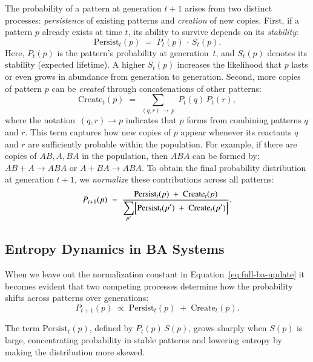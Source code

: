 \documentclass[preprint,12pt]{elsarticle}
\begin{document}
The probability of a pattern at generation \(t+1\) arises from two distinct processes:
\emph{persistence} of existing patterns and \emph{creation} of new copies. First, if a pattern \(p\) already exists at time \(t\), its ability to survive depends on its \emph{stability}:
\begin{equation}
\label{eq:persist-term}
\mathrm{Persist}_t(p) 
\;=\; 
P_t(p)\,\cdot\,S_t(p).
\end{equation}
Here, \(P_t(p)\) is the pattern's probability at generation~\(t\), and \(S_t(p)\) denotes its stability (expected lifetime). A higher \(S_t(p)\) increases the likelihood that \(p\) lasts or even grows in abundance from generation to generation. Second, more copies of pattern \(p\) can be \emph{created} through concatenations of other patterns:
\begin{equation}
\label{eq:create-term}
\mathrm{Create}_t(p)
\;=\;
\sum_{(q,r)\,\to\,p}\;P_t(q)\,P_t(r),
\end{equation}
where the notation \(\,(q,r)\to p\) indicates that \(p\) forms from combining patterns \(q\) and \(r\). This term captures how new copies of \(p\) appear whenever its reactants \(q\) and \(r\) are sufficiently probable within the population. For example, if there are copies of $AB, A, BA$ in the population, then $ABA$ can be formed by: $AB + A \to ABA$ or $A + BA \to ABA$. To obtain the final probability distribution at generation \(t+1\), we \emph{normalize} these contributions across all patterns:
\begin{equation}
\label{eq:full-ba-update}
P_{t+1}(p)
\;=\;
\frac{
  \mathrm{Persist}_t(p)
  \;+\;
  \mathrm{Create}_t(p)
}{
  \displaystyle \sum_{p'} 
  \Bigl[
    \mathrm{Persist}_t(p')
    \;+\;
    \mathrm{Create}_t(p')
  \Bigr]
}.
\end{equation}

\subsection{Entropy Dynamics in BA Systems}

When we leave out the normalization constant in Equation~\ref{eq:full-ba-update} it becomes evident that two competing processes determine how the probability shifts across patterns over generations:
\begin{equation}
P_{t+1}(p) \;\propto\; \mathrm{Persist}_t(p) \;+\; \mathrm{Create}_t(p).
\end{equation}

The term $\mathrm{Persist}_t(p)$, defined by $P_t(p)\,S(p)$, grows sharply when $S(p)$ is large, concentrating probability in stable patterns and lowering entropy by making the distribution more skewed.
\end{document}
